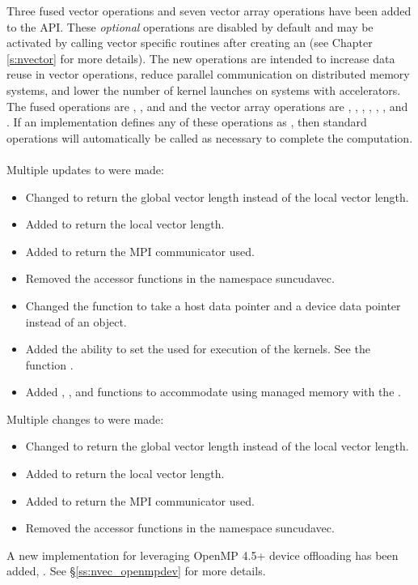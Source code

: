 Three fused vector operations and seven vector array operations have been added
to the {\nvector} API. These \textit{optional} operations are disabled by
default and may be activated by calling vector specific routines after creating
an {\nvector} (see Chapter \ref{s:nvector} for more details). The new operations
are intended to increase data reuse in vector operations, reduce parallel
communication on distributed memory systems, and lower the number of kernel
launches on systems with accelerators. The fused operations are
,
, and
and the vector array operations are
,
,
,
,
,
, and\\
.
If an {\nvector} implementation defines any of these operations as ,
then standard {\nvector} operations will automatically be called as necessary to
complete the computation.
\\
\\
\noindent Multiple updates to {\nveccuda} were made:
\begin{itemize}
  \item Changed  to return the global vector length
        instead of the local vector length.
  \item Added  to return the local vector length.
  \item Added  to return the MPI communicator used.
  \item Removed the accessor functions in the namespace suncudavec.
  \item Changed the  function to take a host data pointer and a device
        data pointer instead of an  object.
  \item Added the ability to set the  used for execution of the
        {\nveccuda} kernels. See the function .
  \item Added , , and
         functions to accommodate using managed
        memory with the {\nveccuda}.
\end{itemize}
%
Multiple changes to {\nvecraja} were made:
\begin{itemize}
  \item Changed  to return the global vector length
        instead of the local vector length.
  \item Added  to return the local vector length.
  \item Added  to return the MPI communicator used.
  \item Removed the accessor functions in the namespace suncudavec.
\end{itemize}
A new {\nvector} implementation for leveraging OpenMP 4.5+ device offloading has
been added, {\nvecopenmpdev}. See \S\ref{ss:nvec_openmpdev} for more details.


